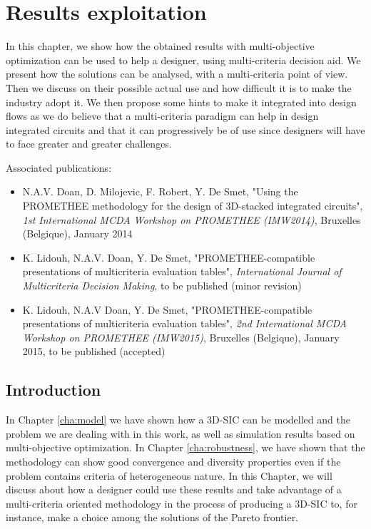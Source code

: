 \chapter{Results exploitation}
\label{cha:resultsexploit}

\begin{summary}
In this chapter, we show how the obtained results with multi-objective optimization can be used to help a designer, using multi-criteria decision aid. We present how the solutions can be analysed, with a multi-criteria point of view. Then we discuss on their possible actual use and how difficult it is to make the industry adopt it. We then propose some hints to make it integrated into design flows as we do believe that a multi-criteria paradigm can help in design integrated circuits and that it can progressively be of use since designers will have to face greater and greater challenges.
\end{summary}

Associated publications:
\begin{itemize}
\item N.A.V. Doan, D. Milojevic, F. Robert, Y. De Smet, "Using the PROMETHEE methodology for the design of 3D-stacked integrated circuits", \textit{1st International MCDA Workshop on PROMETHEE (IMW2014)}, Bruxelles (Belgique), January 2014
\item K. Lidouh, N.A.V. Doan, Y. De Smet, "PROMETHEE-compatible presentations of multicriteria evaluation tables", \textit{International Journal of Multicriteria Decision Making}, to be published (minor revision)
\item K. Lidouh, N.A.V Doan, Y. De Smet, "PROMETHEE-compatible presentations of multicriteria evaluation tables", \textit{2nd International MCDA Workshop on PROMETHEE (IMW2015)}, Bruxelles (Belgique), January 2015, to be published (accepted)
\end{itemize}

\section{Introduction}
In Chapter \ref{cha:model} we have shown how a 3D-SIC can be modelled and the problem we are dealing with in this work, as well as simulation results based on multi-objective optimization. In Chapter \ref{cha:robustness}, we have shown that the methodology can show good convergence and diversity properties even if the problem contains criteria of heterogeneous nature. In this Chapter, we will discuss about how a designer could use these results and take advantage of a multi-criteria oriented methodology in the process of producing a 3D-SIC to, for instance, make a choice among the solutions of the Pareto frontier.

